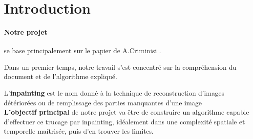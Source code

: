\documentclass[12pt]{article}
\begin{document}

\newpage

\tableofcontents
\setcounter{tocdepth}{2}



\newpage
\section*{Introduction}
\label{sec:intro}

\paragraph{Notre projet}

se base principalement sur le papier de A.Criminisi \cite{criminisi2004region}.

Dans un premier temps, notre travail s'est concentré sur la compréhension 
du document et de l'algorithme expliqué.

\vspace{7pt}

L'\textbf{inpainting} est le nom donné à la technique de reconstruction 
d'images détériorées ou de remplissage des parties manquantes d'une image\\[0.5cm]

\textbf{L'objectif principal} de notre projet va être de construire un 
algorithme capable d'effectuer ce trucage par inpainting, idéalement 
dans une complexité spatiale et temporelle maîtrisée, puis d'en trouver les limites.
\end{document}
